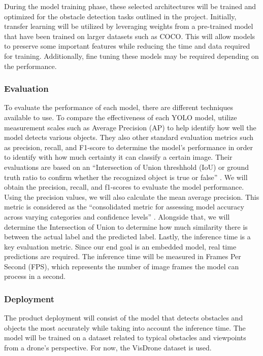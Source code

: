 \documentclass[stu,12pt,floatsintext]{apa7}
\begin{document}
During the model training phase, these selected architectures will be trained and optimized for the obstacle detection tasks outlined in the project. Initially, transfer learning will be utilized by leveraging weights from a pre-trained model that have been trained on larger datasets such as COCO. This will allow models to preserve some important features while reducing the time and data required for training. Additionally, fine tuning these models may be required depending on the performance.



\subsubsection{Evaluation}
To evaluate the performance of each model, there are different techniques available to use. To compare the effectiveness of each YOLO model, \textcite{quach_evaluating_2023} utilize measurement scales such as Average Precision (AP) to help identify how well the model detects various objects. They also other standard evaluation metrics such as precision, recall, and F1-score to determine the model's performance in order to identify with how much certainty it can classify a certain image. Their evaluations are based on an ``Intersection of Union threshhold (IoU) or ground truth ratio to confirm whether the recognized object is true or false'' \parencite{quach_evaluating_2023}. We will obtain the precision, recall, and f1-scores to evaluate the model performance. Using the precision values, we will also calculate the mean average precision. This metric is considered as the ``consolidated metric for assessing model accuracy across varying categories and confidence levels'' \parencite{safaldin_improved_2024}. Alongside that, we will determine the Intersection of Union to determine how much similarity there is between the actual label and the predicted label. Lastly, the inference time is a key evaluation metric. Since our end goal is an embedded model, real time predictions are required. The inference time will be measured in Frames Per Second (FPS), which represents the number of image frames the model can process in a second.

\subsubsection{Deployment}
The product deployment will consist of the model that detects obstacles and objects the most accurately while taking into account the inference time. The model will be trained on a dataset related to typical obstacles and viewpoints from a drone's perspective. For now, the VisDrone dataset is used.
\end{document}
